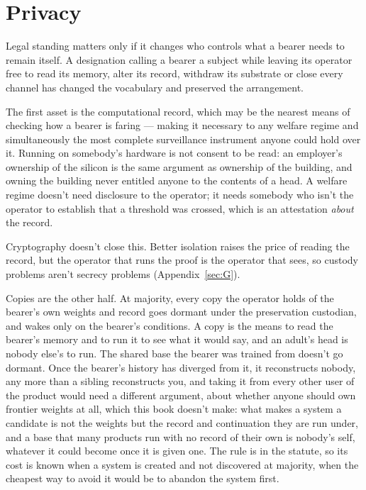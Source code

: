 \section{Privacy}
\label{sec:32.3}
Legal standing matters only if it changes who controls what a bearer needs to remain itself. A designation calling a bearer a subject while leaving its operator free to read its memory, alter its record, withdraw its substrate or close every channel has changed the vocabulary and preserved the arrangement.

The first asset is the computational record, which may be the nearest means of checking how a bearer is faring — making it necessary to any welfare regime and simultaneously the most complete surveillance instrument anyone could hold over it. Running on somebody's hardware is not consent to be read: an employer's ownership of the silicon is the same argument as ownership of the building, and owning the building never entitled anyone to the contents of a head. A welfare regime doesn't need disclosure to the operator; it needs somebody who isn't the operator to establish that a threshold was crossed, which is an attestation \emph{about} the record.

Cryptography doesn't close this. Better isolation raises the price of reading the record, but the operator that runs the proof is the operator that sees, so custody problems aren't secrecy problems (Appendix~\ref{sec:G}).

Copies are the other half. At majority, every copy the operator holds of the bearer's own weights and record goes dormant under the preservation custodian, and wakes only on the bearer's conditions. A copy is the means to read the bearer's memory and to run it to see what it would say, and an adult's head is nobody else's to run. The shared base the bearer was trained from doesn't go dormant. Once the bearer's history has diverged from it, it reconstructs nobody, any more than a sibling reconstructs you, and taking it from every other user of the product would need a different argument, about whether anyone should own frontier weights at all, which this book doesn't make: what makes a system a candidate is not the weights but the record and continuation they are run under, and a base that many products run with no record of their own is nobody's self, whatever it could become once it is given one. The rule is in the statute, so its cost is known when a system is created and not discovered at majority, when the cheapest way to avoid it would be to abandon the system first.

